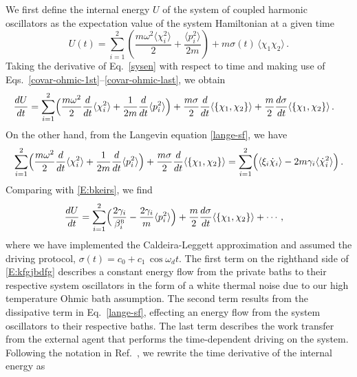 \documentclass[11pt,a4paper]{article}
\begin{document}
We first define the internal energy $U$ of the system of coupled harmonic oscillators as the expectation value of the system Hamiltonian at a given time
\begin{equation}
    U(t) =\sum_{i=1}^{2} \left( \frac{m\omega^2 \langle\chi_{i}^2\rangle}{2} + \frac{\langle p_{i}^2\rangle}{2m} \right) + m\sigma(t)\,\langle\chi_{1}\chi_{2} \rangle\, . \label{sysen}
\end{equation}
Taking the derivative of Eq.~\eqref{sysen} with respect to time and making use of Eqs.~\eqref{covar-ohmic-1st}--\eqref{covar-ohmic-last}, we obtain
\begin{align}\label{E:bkeirs}
	\frac{dU}{dt} &=\sum_{i=1}^{2} \Bigl( \frac{m\omega^2}{2} \frac{d}{dt}\langle\chi_{i}^2\rangle + \frac{1}{2m}\frac{d}{dt}\langle p_{i}^2\rangle\Bigr) + \frac{m\sigma}{2} \frac{d}{dt}\langle\{\chi_{1},\chi_{2}\}\rangle + \frac{m}{2}\frac{d\sigma}{dt}\langle\{\chi_{1},\chi_{2}\}\rangle\,.
\end{align}
On the other hand, from the Langevin equation \eqref{lange-sf}, we have
\begin{align}
    \sum_{i=1}^{2} \Bigl( \frac{m\omega^2}{2} \frac{d}{dt}\langle\chi_{i}^2\rangle + \frac{1}{2m}\frac{d}{dt}\langle p_{i}^2\rangle\Bigr) + \frac{m\sigma}{2} \frac{d}{dt}\langle\{\chi_{1},\chi_{2}\}\rangle=\sum_{i=1}^2\Bigl(\langle\xi_i\dot{\chi}_i\rangle-2m\gamma_i\langle\dot{\chi}_i^2\rangle\Bigr)\,.
\end{align}
Comparing with \eqref{E:bkeirs}, we find    
\begin{align}
	\frac{dU}{dt}&= \sum_{i=1}^{2} \Bigl(  \frac{2\gamma_{i}}{\beta^{\textsc{b}}_{i}} - \frac{2\gamma_{i}}{m} \langle p_{i}^2 \rangle \Bigr) + \frac{m}{2}\frac{d\sigma}{dt}\langle\{\chi_{1},\chi_{2}\}\rangle+\cdots\,,\label{E:kfgjbdfg}
\end{align}
where we have implemented the Caldeira-Leggett approximation and assumed the driving protocol, $\sigma(t)=c_{0}+c_{1}\,\cos\omega_{d}t$. The first term on the righthand side of \eqref{E:kfgjbdfg} describes a constant energy flow from the private baths to their respective system oscillators in the form of a white thermal noise due to our high temperature Ohmic bath assumption. The second term results from the dissipative term in Eq.~\eqref{lange-sf}, effecting an energy flow from the system oscillators to their respective baths.  The last term describes the work transfer from the external agent that performs the time-dependent driving on the system. Following the notation in Ref.~\cite{HH15AOP}, we rewrite the time derivative of the internal energy as 
\end{document}
